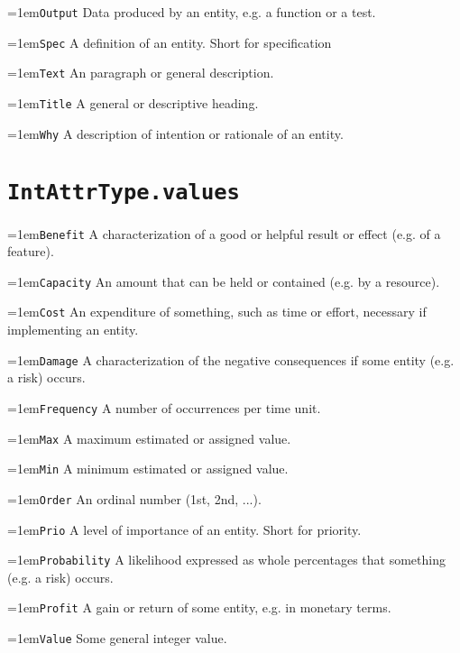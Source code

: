 \documentclass[a4paper,oneside]{article}
\newcommand\Concept[2]{\hangindent=1em\lstinline+#1+ #2}
\begin{document}
\begin{multicols}{2}
\Concept{Output}{Data produced by an entity, e.g. a function or a test.}

\Concept{Spec}{A definition of an entity. Short for specification}

\Concept{Text}{An paragraph or general description.}

\Concept{Title}{A general or descriptive heading.}

\Concept{Why}{A description of intention or rationale of an entity.}


\section*{\texttt{IntAttrType.values}}
\Concept{Benefit}{A characterization of a good or helpful result or effect (e.g. of a feature).}

\Concept{Capacity}{An amount that can be held or contained (e.g. by a resource).}

\Concept{Cost}{An expenditure of something, such as time or effort, necessary if implementing an entity.}

\Concept{Damage}{A characterization of the negative consequences if some entity (e.g. a risk) occurs.}

\Concept{Frequency}{A number of occurrences per time unit. }

\Concept{Max}{A maximum estimated or assigned value.}

\Concept{Min}{A minimum estimated or assigned value.}

\Concept{Order}{An ordinal number (1st, 2nd, ...).}

\Concept{Prio}{A level of importance of an entity. Short for priority.}

\Concept{Probability}{A likelihood expressed as whole percentages that something (e.g. a risk) occurs.}

\Concept{Profit}{A gain or return of some entity, e.g. in monetary terms.}

\Concept{Value}{Some general integer value.}
 
\end{multicols}
\end{document}
